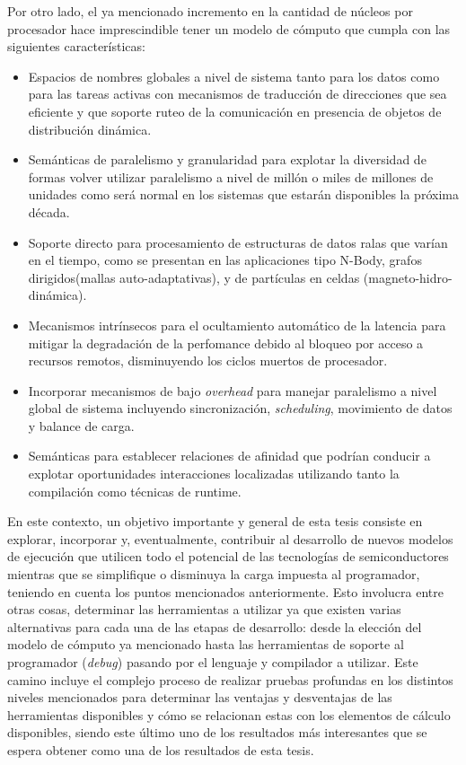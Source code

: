 \documentclass[a4paper,10pt]{article}
\begin{document}
Por otro lado, el ya mencionado incremento en la cantidad de n\'ucleos por procesador hace imprescindible tener un modelo de c\'omputo que cumpla con las siguientes caracter\'isticas:
\begin{itemize}
\item Espacios de nombres globales a nivel de sistema tanto para los datos como para las tareas activas con mecanismos de traducci\'on de direcciones que sea eficiente y que soporte ruteo de la comunicaci\'on en presencia de objetos de distribuci\'on din\'amica.

\item Sem\'anticas de paralelismo y granularidad para explotar la diversidad de formas volver utilizar paralelismo a nivel de mill\'on o miles de millones de unidades como ser\'a normal en los sistemas que estar\'an disponibles la pr\'oxima d\'ecada.

\item Soporte directo para procesamiento de estructuras de datos ralas que var\'ian en el tiempo, como se presentan en las aplicaciones tipo N-Body, grafos dirigidos(mallas auto-adaptativas), y de part\'iculas en celdas (magneto-hidro-din\'amica).

\item Mecanismos intr\'insecos para el ocultamiento autom\'atico de la latencia para mitigar la degradaci\'on de la perfomance debido al bloqueo por acceso a recursos remotos, disminuyendo los ciclos muertos de procesador.

\item Incorporar mecanismos de bajo \emph{overhead} para manejar paralelismo a nivel global de sistema incluyendo sincronizaci\'on, \emph{scheduling}, movimiento de datos y balance de carga.

\item Sem\'anticas para establecer relaciones de afinidad que podr\'ian conducir a explotar oportunidades interacciones localizadas utilizando tanto la compilaci\'on como t\'ecnicas de runtime.

\end{itemize}

En este contexto, un objetivo importante y general de esta tesis consiste en explorar, incorporar y, eventualmente, contribuir al desarrollo de nuevos modelos de ejecuci\'on que utilicen todo el potencial de las tecnolog\'ias de semiconductores mientras que se simplifique o disminuya la carga impuesta al programador, teniendo en cuenta los puntos mencionados anteriormente. Esto involucra entre otras cosas, determinar las herramientas a utilizar ya que existen varias alternativas para cada una de las etapas de desarrollo: desde la elecci\'on del modelo de c\'omputo ya mencionado hasta las herramientas de soporte al programador (\emph{debug}) pasando por el lenguaje y compilador a utilizar. Este camino incluye el complejo proceso de realizar pruebas profundas en los distintos niveles mencionados para determinar las ventajas y desventajas de las herramientas disponibles y c\'omo se relacionan estas con los elementos de c\'alculo disponibles, siendo este \'ultimo uno de los resultados m\'as interesantes que se 
espera obtener como una de los resultados de esta tesis.
\end{document}
